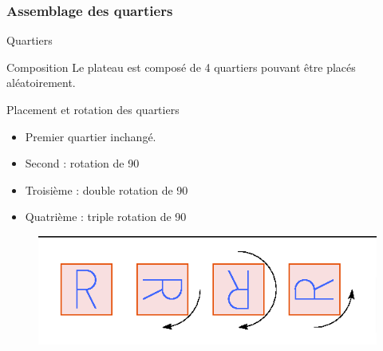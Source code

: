 \documentclass{beamer}
\begin{document}
        \subsubsection{Assemblage des quartiers}
        \begin{frame}{Quartiers}
            \begin{block}{Composition}
                Le plateau est composé de 4 quartiers pouvant être placés aléatoirement.
            \end{block}
            \begin{center}
            \end{center}
        \end{frame}
        \begin{frame}{Placement et rotation des quartiers}
            \begin{itemize}
                \item Premier quartier inchangé.
                \item Second : rotation de 90\degree
                \item Troisième : double rotation de 90\degree
                \item Quatrième : triple rotation de 90\degree
            \end{itemize}
            \begin{figure}
                \centering
                \includegraphics[scale=0.5]{Images/rota.png}
            \end{figure}
        \end{frame}
 
\end{document}

